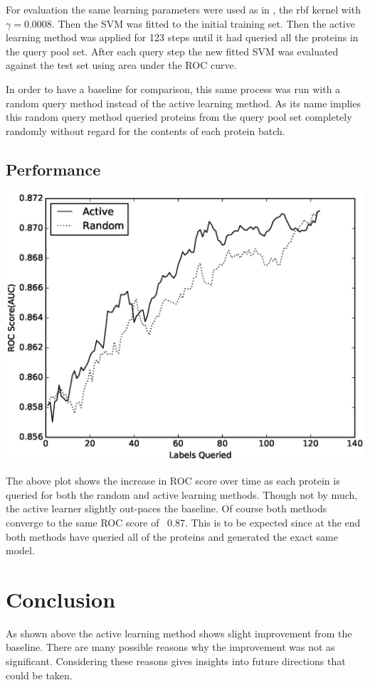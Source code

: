 \documentclass{article}
\begin{document}
For evaluation the same learning parameters were used as in \cite{dbsi_server}, the rbf kernel with $\gamma = 0.0008$. Then the SVM was fitted to the initial training set. Then the active learning method was applied for 123 steps until it had queried all the proteins in the query pool set. After each query step the new fitted SVM was evaluated against the test set using area under the ROC curve. 

In order to have a baseline for comparison, this same process was run with a random query method instead of the active learning method. As its name implies this random query method queried proteins from the query pool set completely randomly without regard for the contents of each protein batch. 
\subsection*{Performance}

\includegraphics[scale=0.5]{plot}

The above plot shows the increase in ROC score over time as each protein is queried for both the random and active learning methods. Though not by much, the active learner slightly out-paces the baseline. Of course both methods converge to the same ROC score of ~0.87. This is to be expected since at the end both methods have queried all of the proteins and generated the exact same model.   


\section*{Conclusion}
As shown above the active learning method shows slight improvement from the baseline. There are many possible reasons why the improvement was not as significant. Considering these reasons gives insights into future directions that could be taken.
\end{document}
